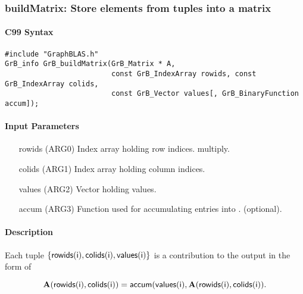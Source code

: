 \subsubsection{{\sf buildMatrix}: Store elements from tuples into a matrix}

\paragraph{C99 Syntax}

\begin{verbatim}
#include "GraphBLAS.h"
GrB_info GrB_buildMatrix(GrB_Matrix * A,
                         const GrB_IndexArray rowids, const GrB_IndexArray colids, 
                         const GrB_Vector values[, GrB_BinaryFunction accum]);
\end{verbatim}


\paragraph{Input Parameters}

\begin{itemize}
	\item[{\sf rowids}] ({\sf ARG0}) Index array holding row indices. 
	multiply.

	\item[{\sf colids}] ({\sf ARG1}) Index array holding column indices. 

	\item[{\sf values}] ({\sf ARG2}) Vector holding values.  

	\item[{\sf accum}] ({\sf ARG3}) Function used for accumulating entries into . (optional). 
\end{itemize}

\paragraph{Description}
Each tuple $\{ {\sf rowids(i)}, {\sf colids(i)}, {\sf values(i)}\}$ is a contribution to the output in the form of 

$${\bf A}({\sf rowids(i)}, {\sf colids(i)}) = {\sf accum}({\sf values(i)}, {\bf A}({\sf rowids(i)}, {\sf colids(i)}).$$ 

